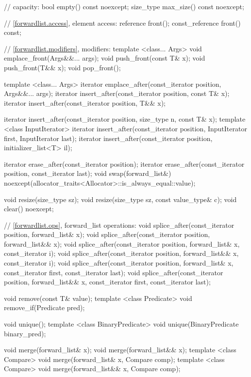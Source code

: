 \begin{codeblock}
{{    // capacity:
    bool      empty() const noexcept;
    size_type max_size() const noexcept;

    // \ref{forwardlist.access}, element access:
    reference front();
    const_reference front() const;

    // \ref{forwardlist.modifiers}, modifiers:
    template <class... Args> void emplace_front(Args&&... args);
    void push_front(const T& x);
    void push_front(T&& x);
    void pop_front();

    template <class... Args> iterator emplace_after(const_iterator position, Args&&... args);
    iterator insert_after(const_iterator position, const T& x);
    iterator insert_after(const_iterator position, T&& x);

    iterator insert_after(const_iterator position, size_type n, const T& x);
    template <class InputIterator>
      iterator insert_after(const_iterator position, InputIterator first, InputIterator last);
    iterator insert_after(const_iterator position, initializer_list<T> il);

    iterator erase_after(const_iterator position);
    iterator erase_after(const_iterator position, const_iterator last);
    void swap(forward_list&)
      noexcept(allocator_traits<Allocator>::is_always_equal::value);

    void resize(size_type sz);
    void resize(size_type sz, const value_type& c);
    void clear() noexcept;

    // \ref{forwardlist.ops}, forward_list operations:
    void splice_after(const_iterator position, forward_list& x);
    void splice_after(const_iterator position, forward_list&& x);
    void splice_after(const_iterator position, forward_list& x,
                      const_iterator i);
    void splice_after(const_iterator position, forward_list&& x,
                      const_iterator i);
    void splice_after(const_iterator position, forward_list& x,
                      const_iterator first, const_iterator last);
    void splice_after(const_iterator position, forward_list&& x,
                      const_iterator first, const_iterator last);

    void remove(const T& value);
    template <class Predicate> void remove_if(Predicate pred);

    void unique();
    template <class BinaryPredicate> void unique(BinaryPredicate binary_pred);

    void merge(forward_list& x);
    void merge(forward_list&& x);
    template <class Compare> void merge(forward_list& x, Compare comp);
    template <class Compare> void merge(forward_list&& x, Compare comp);

}}
\end{codeblock}
